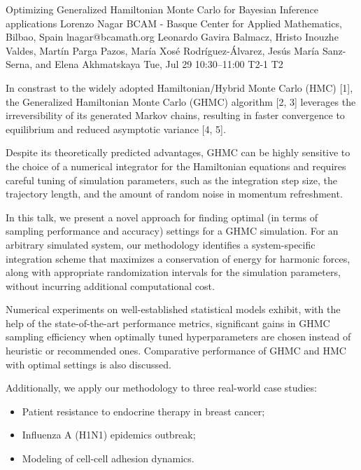\begin{talk}
  {Optimizing Generalized Hamiltonian Monte Carlo for Bayesian Inference applications}%
  {Lorenzo Nagar}%
  {BCAM - Basque Center for Applied Mathematics, Bilbao, Spain}%
  {lnagar@bcamath.org}%
  {Leonardo Gavira Balmacz, Hristo Inouzhe Valdes, Mart\'in Parga Pazos, Mar\'ia Xos\'e Rodr\'iguez-\'Alvarez, Jes\'us Mar\'ia Sanz-Serna, and Elena Akhmatskaya}%
  {}%
  {Tue, Jul 29 10:30–11:00}%
  {T2-1}%
  {T2}%
  
				
			
In constrast to the widely adopted Hamiltonian/Hybrid Monte Carlo (HMC) [1], the Generalized Hamiltonian Monte Carlo (GHMC) algorithm [2, 3] leverages the irreversibility of its generated Markov chains, resulting in faster convergence to equilibrium and reduced asymptotic variance [4, 5]. 

Despite its theoretically predicted advantages, GHMC can be highly sensitive to the choice of a numerical integrator for the Hamiltonian equations and requires careful tuning of simulation parameters, such as the integration step size, the trajectory length, and the amount of random noise in momentum refreshment.

In this talk, we present a novel approach for finding optimal (in terms of sampling performance and accuracy) settings for a GHMC simulation. For an arbitrary simulated system, our methodology identifies a system-specific integration scheme that maximizes a conservation of energy for harmonic forces, along with appropriate randomization intervals for the simulation parameters, without incurring additional computational cost.

Numerical experiments on well-established statistical models exhibit, with the help of the state-of-the-art performance metrics, significant gains in GHMC sampling efficiency when optimally tuned hyperparameters are chosen instead of heuristic or recommended ones. Comparative performance of GHMC and HMC with optimal settings is also discussed. 

Additionally, we apply our methodology to three real-world case studies:
\begin{itemize}
\item Patient resistance to endocrine therapy in breast cancer;
\item Influenza A (H1N1) epidemics outbreak;
\item Modeling of cell-cell adhesion dynamics.
\end{itemize}


\end{talk}
